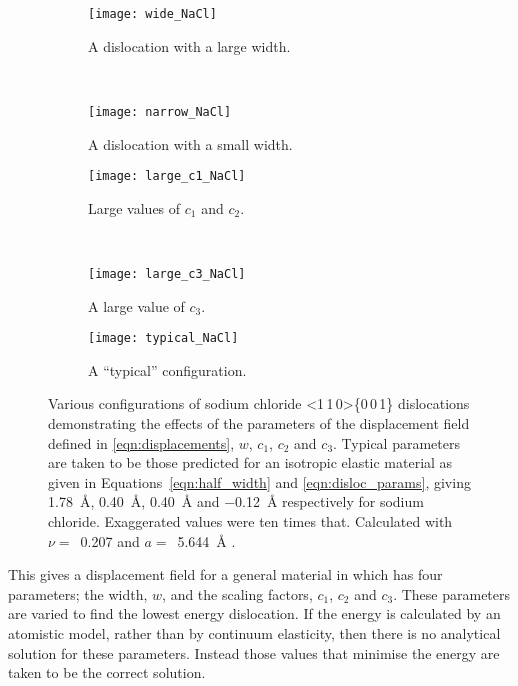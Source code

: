 \begin{figure}
\centering

    \begin{subfigure}{0.4\textwidth}
    \centering
    \texttt{[image: wide\_NaCl]}
    \caption{A dislocation with a large width.}
    \end{subfigure}
    ~
    \begin{subfigure}{0.4\textwidth}
    \centering
    \texttt{[image: narrow\_NaCl]}
    \caption{A dislocation with a small width.}
    \end{subfigure}

	\begin{subfigure}{0.4\textwidth}
	\centering
    \texttt{[image: large\_c1\_NaCl]}
    \caption{Large values of $c_1$ and $c_2$.}
	\end{subfigure}
    ~
	\begin{subfigure}{0.4\textwidth}
	\centering
    \texttt{[image: large\_c3\_NaCl]}
    \caption{A large value of $c_3$.}
	\end{subfigure}

    \begin{subfigure}{0.8\textwidth}
    \centering
    \texttt{[image: typical\_NaCl]}
    \caption{A ``typical'' configuration.}
    \end{subfigure}

\captionsetup{width=0.8\textwidth}
\caption[The displacement field around an edge dislocation in rock salt.]{Various configurations of sodium chloride <1\,1\,0>\{0\,0\,1\} dislocations demonstrating the effects of the parameters of the displacement field defined in \autoref{eqn:displacements}, $w$, $c_1$, $c_2$ and $c_3$. Typical parameters are taken to be those predicted for an isotropic elastic material as given in  Equations~\ref{eqn:half_width} and \ref{eqn:disloc_params}, giving \SI{1.78}{\angstrom}, \SI{0.40}{\angstrom}, \SI{0.40}{\angstrom} and \SI{-0.12}{\angstrom} respectively for sodium chloride. Exaggerated values were ten times that. Calculated with $\nu =$~\num{0.207} and $a =$~\SI{5.644}{\angstrom} \cite{Theocaris1994,Rao1990}.\label{fig:parameters_of_the_disloc_configuration}}
\end{figure}


This gives a displacement field for a general material in which has four parameters; the width, $w$, and the scaling factors, $c_1$, $c_2$ and $c_3$. These parameters are varied to find the lowest energy dislocation. If the energy is calculated by an atomistic model, rather than by continuum elasticity, then there is no analytical solution for these parameters. Instead those values that minimise the energy are taken to be the correct solution.


